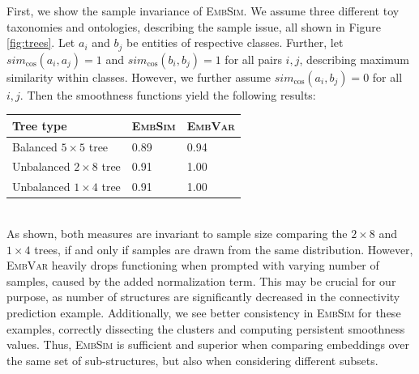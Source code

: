 \documentclass[]{article}
\begin{document}
First, we show the sample invariance of \textsc{EmbSim}. We assume three different toy taxonomies and ontologies, describing the sample issue, all shown in Figure \ref{fig:trees}. Let $a_i $  and $b_j$ be entities of respective classes. Further, let $sim_\text{cos}(a_i, a_j)=1$ and $sim_\text{cos}(b_i, b_j)=1$ for all pairs $i,j$, describing maximum similarity within classes. However, we further assume $sim_\text{cos}(a_i, b_j)=0$ for all $i,j$. Then the smoothness functions yield the following results:\\

{
\centering
\renewcommand{\arraystretch}{1.5}
\hspace{3cm}\begin{tabular}{l|ll}
	Tree type& \textsc{EmbSim} & \textsc{EmbVar}\\
	\hline
	Balanced $5\times 5$ tree&0.89&0.94\\
	Unbalanced $2\times 8$ tree&0.91&1.00\\
	Unbalanced $1\times 4$ tree&0.91&1.00\\
\end{tabular}
}\\

As shown, both measures are invariant to sample size comparing the $2\times 8$ and $1\times 4$ trees, if and only if samples are drawn from the same distribution. However, \textsc{EmbVar} heavily drops functioning when prompted with varying number of samples, caused by the added normalization term. This may be crucial for our purpose, as number of structures are significantly decreased in the connectivity prediction example. Additionally, we see better consistency in \textsc{EmbSim} for these examples, correctly dissecting the clusters and computing persistent smoothness values. Thus, \textsc{EmbSim} is sufficient and superior when comparing embeddings over the same set of sub-structures, but also when considering different subsets.\\
\end{document}

